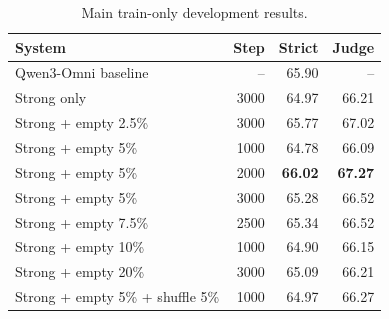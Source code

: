 \begin{table}[t]
\centering
\small
\caption{Main train-only development results.}
\label{tab:main_results}
\begin{tabular}{l|rrr}
\toprule
System & Step & Strict & Judge \\
\midrule
Qwen3-Omni baseline & -- & 65.90 & -- \\
Strong only & 3000 & 64.97 & 66.21 \\
Strong + empty 2.5\% & 3000 & 65.77 & 67.02 \\
Strong + empty 5\% & 1000 & 64.78 & 66.09 \\
Strong + empty 5\% & 2000 & \textbf{66.02} & \textbf{67.27} \\
Strong + empty 5\% & 3000 & 65.28 & 66.52 \\
Strong + empty 7.5\% & 2500 & 65.34 & 66.52 \\
Strong + empty 10\% & 1000 & 64.90 & 66.15 \\
Strong + empty 20\% & 3000 & 65.09 & 66.21 \\
Strong + empty 5\% + shuffle 5\% & 1000 & 64.97 & 66.27 \\
\bottomrule
\end{tabular}
\vspace{-15pt}
\end{table}